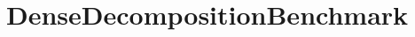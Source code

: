 \hypertarget{group___dense_decomposition_benchmark}{}\section{Dense\+Decomposition\+Benchmark}
\label{group___dense_decomposition_benchmark}
